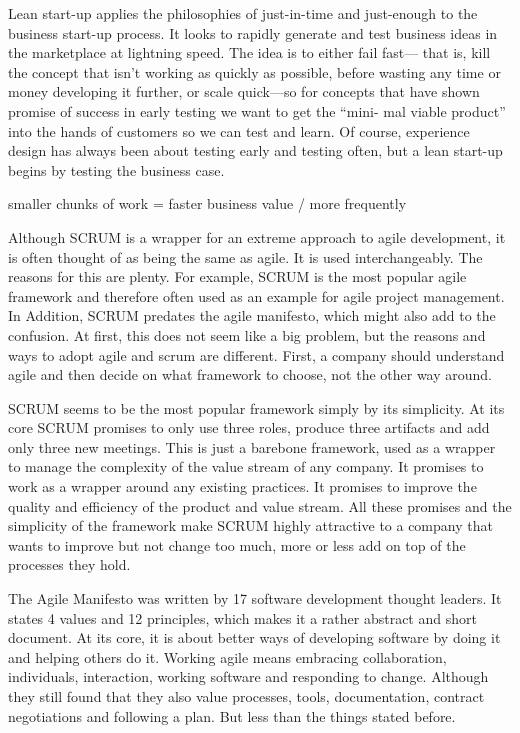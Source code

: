 {Lean start-up applies the philosophies of just-in-time and just-enough to the business start-up process. It looks to rapidly generate and test business ideas in the marketplace at lightning speed. The idea is to either fail fast— that is, kill the concept that isn’t working as quickly as possible, before wasting any time or money developing it further, or scale quick—so for concepts that have shown promise of success in early testing we want to get the “mini- mal viable product” into the hands of customers so we can test and learn.
Of course, experience design has always been about testing early and testing often, but a lean start-up begins by testing the business case.

smaller chunks of work = faster business value / more frequently
}


Although SCRUM is a wrapper for an extreme approach to agile development, it is often thought of as being the same as agile. It is used interchangeably. The reasons for this are plenty. For example, SCRUM is the most popular agile framework and therefore often used as an example for agile project management. In Addition, SCRUM predates the agile manifesto, which might also add to the confusion. At first, this does not seem like a big problem, but the reasons and ways to adopt agile and scrum are different. First, a company should understand agile and then decide on what framework to choose, not the other way around. 

SCRUM seems to be the most popular framework simply by its simplicity. At its core SCRUM promises to only use three roles, produce three artifacts and add only three new meetings. This is just a barebone framework, used as a wrapper to manage the complexity of the value stream of any company. It promises to work as a wrapper around any existing practices. It promises to improve the quality and efficiency of the product and value stream. All these promises and the simplicity of the framework make SCRUM highly attractive to a company that wants to improve but not change too much, more or less add on top of the processes they hold.

The Agile Manifesto was written by 17 software development thought leaders. It states 4 values and 12 principles, which makes it a rather abstract and short document. At its core, it is about better ways of developing software by doing it and helping others do it. Working agile means embracing collaboration, individuals, interaction, working software and responding to change. Although they still found that they also value processes, tools, documentation, contract negotiations and following a plan. But less than the things stated before.


